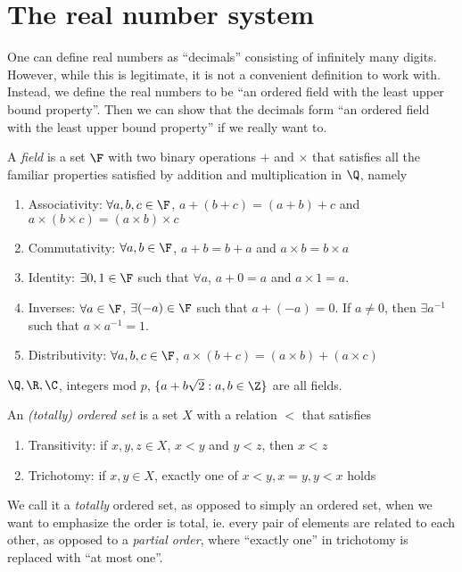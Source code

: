 \documentclass[a4paper]{article}
\begin{document}
\tableofcontents

\section{The real number system}
One can define real numbers as ``decimals'' consisting of infinitely many digits. However, while this is legitimate, it is not a convenient definition to work with. Instead, we define the real numbers to be ``an ordered field with the least upper bound property''. Then we can show that the decimals form ``an ordered field with the least upper bound property'' if we really want to.
\begin{defi}[Field]
  A \emph{field} is a set $\F$ with two binary operations $+$ and $\times$ that satisfies all the familiar properties satisfied by addition and multiplication in $\Q$, namely
  \begin{enumerate}
    \item Associativity: $\forall a, b, c\in \F$, $a + (b + c) = (a + b) + c$ and $a\times (b\times c) = (a\times b)\times c$
    \item Commutativity: $\forall a, b\in \F$, $a + b = b + a$ and $a\times b= b\times a$
    \item Identity: $\exists 0, 1\in \F$ such that $\forall a$, $a + 0 = a$ and $a\times 1 = a$.
    \item Inverses: $\forall a\in \F$, $\exists (-a)\in \F$ such that $a + (-a) = 0$. If $a\not= 0$, then $\exists a^{-1}$ such that $a\times a^{-1} = 1$.
    \item Distributivity: $\forall a, b, c\in \F$, $a\times (b + c) = (a\times b) + (a\times c)$
  \end{enumerate}
\end{defi}

\begin{eg}
  $\Q, \R, \C$, integers mod $p$, $\{a + b\sqrt{2}: a, b\in \Z\}$ are all fields.
\end{eg}

\begin{defi}
  An \emph{(totally) ordered set} is a set $X$ with a relation $<$ that satisfies
  \begin{enumerate}
    \item Transitivity: if $x, y, z\in X$, $x < y$ and $y < z$, then $x < z$
    \item Trichotomy: if $x, y\in X$, exactly one of $x < y, x = y, y < x$ holds
  \end{enumerate}
\end{defi}
We call it a \emph{totally} ordered set, as opposed to simply an ordered set, when we want to emphasize the order is total, ie. every pair of elements are related to each other, as opposed to a \emph{partial order}, where ``exactly one'' in trichotomy is replaced with ``at most one''.
\end{document}
